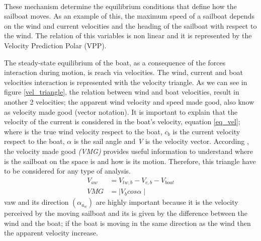 \\
These mechanism determine the equilibrium conditions that define how the sailboat moves\cite{fossati2009aero}.  As an example of this, the maximum speed of a sailboat depends on the wind and current velocities and the heading of the sailboat with respect to the wind. The relation of this variables is non linear and it is represented by the Velocity Prediction Polar (VPP).\par

The steady-state equilibrium of the boat, as a consequence of the forces interaction during motion,  is reach via velocities. The wind, current and boat velocities interaction is represented with the velocity triangle.  As we can see in figure \ref{vel_triangle}, the relation between wind and boat velocities, result in another 2 velocities; the apparent wind velocity  and speed made good,  also know as velocity made good (vector notation). It is important to explain that the velocity of the current is considered in the boat's velocity, equation \ref{eq_vel}; where  is the true wind velocity respect to the boat,  $c_b$ is the current velocity respect to the boat, $\alpha$ is the sail angle and \textit{V} is the velocity vector. According \cite{larsonprinciples}, the velocity made good \textit{(VMG)} provides useful information to understand where is the sailboat on the space is and how is its motion. Therefore, this triangle have to be considered for any type of analysis.
\begin{equation} [ht]
\label{eq_vel}
\begin{aligned}
V_{aw} & = V_{tw,b} - V_{c,b} - V_{boat} \\ 
VMG &=  \mid V_b cos \alpha  \mid 
\end{aligned}
\end {equation}
vaw and its direction $( \alpha_{a_w})$ are highly important because it is the velocity perceived by the moving sailboat and its is given by the difference between the wind and the boat; if the boat is moving in the same direction as the wind then the apparent velocity increase. 

